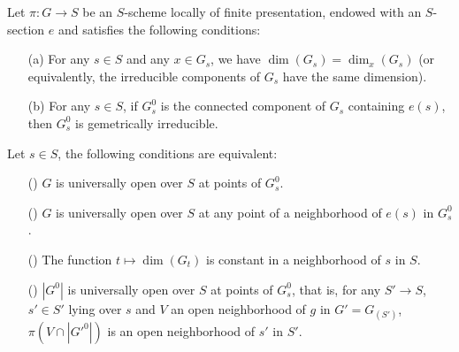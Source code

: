 \begin{proposition}\label{scheme group uo at identity component of s iff}
Let $\pi:G\to S$ be an $S$-scheme locally of finite presentation, endowed with an $S$-section $e$ and satisfies the following conditions:
\begin{enumerate}
    \item[(a)] For any $s\in S$ and any $x\in G_s$, we have $\dim(G_s)=\dim_x(G_s)$ (or equivalently, the irreducible components of $G_s$ have the same dimension).
    \item[(b)] For any $s\in S$, if $G_s^0$ is the connected component of $G_s$ containing $e(s)$, then $G^0_s$ is gemetrically irreducible.
\end{enumerate}
Let $s\in S$, the following conditions are equivalent:
\begin{enumerate}
    \item[(\rmnum{1})] $G$ is universally open over $S$ at points of $G^0_s$.
    \item[(\rmnum{2})] $G$ is universally open over $S$ at any point of a neighborhood of $e(s)$ in $G_s^0$. 
    \item[(\rmnum{3})] The function $t\mapsto\dim(G_t)$ is constant in a neighborhood of $s$ in $S$. 
    \item[(\rmnum{4})] $|G^0|$ is universally open over $S$ at points of $G^0_s$, that is, for any $S'\to S$, $s'\in S'$ lying over $s$ and $V$ an open neighborhood of $g$ in $G'=G_{(S')}$, $\pi(V\cap |G'^0|)$ is an open neighborhood of $s'$ in $S'$. 
\end{enumerate}
\end{proposition}
